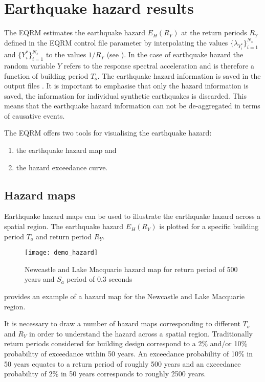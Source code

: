 \section{Earthquake hazard results}
\label{sec:risk-hzd-results} The EQRM estimates the earthquake
hazard $E_H(R_Y)$ at the return periods $R_Y$ defined in the
EQRM control file parameter  by    
interpolating the values $\{ \lambda_{Y_i^*}\}_{i=1}^{N_s}$ and
$\{Y_i^*\}_{i=1}^{N_s}$ to the values $1/R_Y$ (see
). In the case of earthquake hazard the
random variable $Y$ refers to the response spectral
acceleration and is
therefore a function of building period $T_o$. The earthquake
hazard information is saved in the output files
. It is important to
emphasise that only the hazard information is saved, the
information for individual synthetic earthquakes is discarded.
This means that the earthquake hazard information can not be
de-aggregated in terms of causative events.

The EQRM offers two tools for visualising the earthquake hazard:
\begin{enumerate}
\item the earthquake hazard map and \item the hazard exceedance
curve.
\end{enumerate}

\subsection{Hazard maps}

Earthquake hazard maps can be used to illustrate the earthquake
hazard across a spatial region. The earthquake hazard $E_H(R_Y)$
is plotted for a specific building period $T_o$ and return period
$R_Y$.
\begin{figure}
\texttt{[image: demo\_hazard]}
\caption{Newcastle and Lake Macquarie hazard map for return period
of 500 years and $S_a$ period of 0.3 seconds}
\label{fig:risk-hazardmap}
\end{figure}
 provides an example of a hazard map for
the Newcastle and Lake Macquarie region.

It is necessary to draw a number of hazard maps corresponding to
different $T_o$ and $R_Y$ in order to understand the hazard across
a spatial region. Traditionally return periods considered for
building design correspond to a 2\% and/or 10\% probability of
exceedance within 50 years. An exceedance probability of 10\% in
50 years equates to a return period of roughly 500 years and an
exceedance probability of 2\% in 50 years corresponds to roughly
2500 years.

